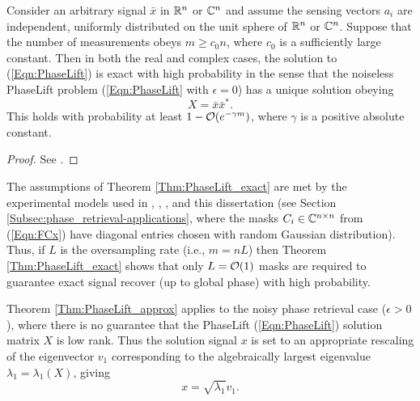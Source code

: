 \begin{theorem}  \label{Thm:PhaseLift_exact}
Consider an arbitrary signal $\bar{x}$ in ${\mathbb R}^n$ or ${\mathbb C}^n$ and assume the sensing vectors $a_i$ are independent, uniformly distributed on the unit sphere of ${\mathbb R}^n$ or ${\mathbb C}^n$.  Suppose that the number of measurements obeys $m \geq c_0 n$, where $c_0$ is a sufficiently large constant. Then in both the real and complex cases, the solution to (\ref{Eqn:PhaseLift}) is exact with high probability in the sense that the noiseless PhaseLift problem (\ref{Eqn:PhaseLift} with $\epsilon = 0$) has a unique solution obeying
\[
X = \bar{x}\bar{x}^*.
\]
This holds with probability at least $1 - {\mathcal O}(e^{-\gamma m})$, where $\gamma$ is a positive absolute constant.
\end{theorem}
\begin{proof}
See \cite[Section 2]{candes2014solving}.
\end{proof}




The assumptions of Theorem \ref{Thm:PhaseLift_exact} are met by the experimental models used in \cite{DBLP:journals/siamis/CandesESV13}, \cite{candes2013phaselift}, \cite{DBLP:journals/siamsc/FriedlanderM16}, and this dissertation (see Section \ref{Subsec:phase_retrieval-applications}, where the masks $C_i \in {\mathbb C}^{n \times n}$ from (\ref{Eqn:FCx}) have diagonal entries chosen with random Gaussian distribution).  Thus, if $L$ is the oversampling rate (i.e., $m = nL$) then Theorem \ref{Thm:PhaseLift_exact} shows that only $L = {\mathcal O}(1)$ masks are required to guarantee exact signal recover (up to global phase) with high probability.




Theorem \ref{Thm:PhaseLift_approx} applies to the  noisy phase retrieval case ($\epsilon > 0$), where there is no guarantee that the PhaseLift (\ref{Eqn:PhaseLift}) solution matrix $X$ is low rank.  Thus the solution signal $x$ is set to an appropriate rescaling of the eigenvector $v_1$ corresponding to the algebraically largest eigenvalue $\lambda_1 = \lambda_1 (X)$, giving
\begin{equation}  			\label{Eqn:PhaseLift_solution_signal}
x = \sqrt{\lambda_1}v_1.
\end{equation}

